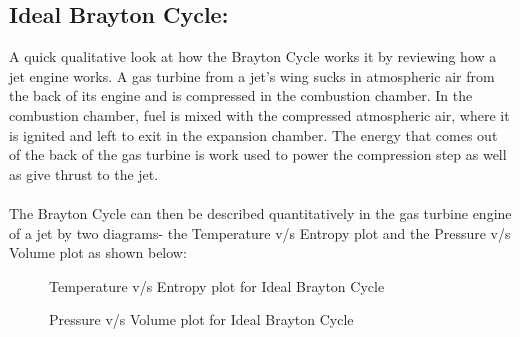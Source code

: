 \documentclass[12pt,a4paper]{article}
\begin{document}
\subsection{Ideal Brayton Cycle:}
A quick qualitative look at how the Brayton Cycle works it by reviewing how a jet engine works. A gas turbine from a jet’s wing sucks in atmospheric air from the back of its engine and is compressed in the combustion chamber. In the combustion chamber, fuel is mixed with the compressed atmospheric air, where it is ignited and left to exit in the expansion chamber. The energy that comes out of the back of the gas turbine is work used to power the compression step as well as give thrust to the jet.\\
\\The Brayton Cycle can then be described quantitatively in the gas turbine engine of a jet by two diagrams- the Temperature v/s Entropy plot and the Pressure v/s Volume plot as shown below:
\begin{figure}[!ht]
	\begin{center}
	\end{center}
	\caption{Temperature v/s Entropy plot for Ideal Brayton Cycle}
\end{figure}
\begin{figure}[!ht]
	\begin{center}
	\end{center}
	\caption{Pressure v/s Volume plot for Ideal Brayton Cycle}
\end{figure}
\end{document}

